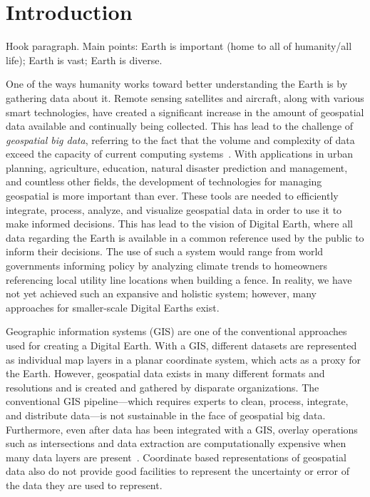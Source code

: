\chapter{Introduction}
Hook paragraph. Main points:
Earth is important (home to all of humanity/all life);
Earth is vast;
Earth is diverse.



One of the ways humanity works toward better understanding the Earth is by gathering data about it.
Remote sensing satellites and aircraft, along with various smart technologies, have created a significant increase in the amount of geospatial data available and continually being collected.
This has lead to the challenge of \textit{geospatial big data}, referring to the fact that the volume and complexity of data exceed the capacity of current computing systems~\cite{lee2015geospatial}.
With applications in urban planning, agriculture, education, natural disaster prediction and management, and countless other fields, the development of technologies for managing geospatial is more important than ever.
These tools are needed to efficiently integrate, process, analyze, and visualize geospatial data in order to use it to make informed decisions.
This has lead to the vision of Digital Earth, where all data regarding the Earth is available in a common reference used by the public to inform their decisions.
The use of such a system would range from world governments informing policy by analyzing climate trends to homeowners referencing local utility line locations when building a fence.
In reality, we have not yet achieved such an expansive and holistic system; however, many approaches for smaller-scale Digital Earths exist.


Geographic information systems (GIS) are one of the conventional approaches used for creating a Digital Earth.
With a GIS, different datasets are represented as individual map layers in a planar coordinate system, which acts as a proxy for the Earth.
However, geospatial data exists in many different formats and resolutions and is created and gathered by disparate organizations.
The conventional GIS pipeline---which requires experts to clean, process, integrate, and distribute data---is not sustainable in the face of geospatial big data.
Furthermore, even after data has been integrated with a GIS, overlay operations such as intersections and data extraction are computationally expensive when many data layers are present~\cite{wang2015improving}.
Coordinate based representations of geospatial data also do not provide good facilities to represent the uncertainty or error of the data they are used to represent.


